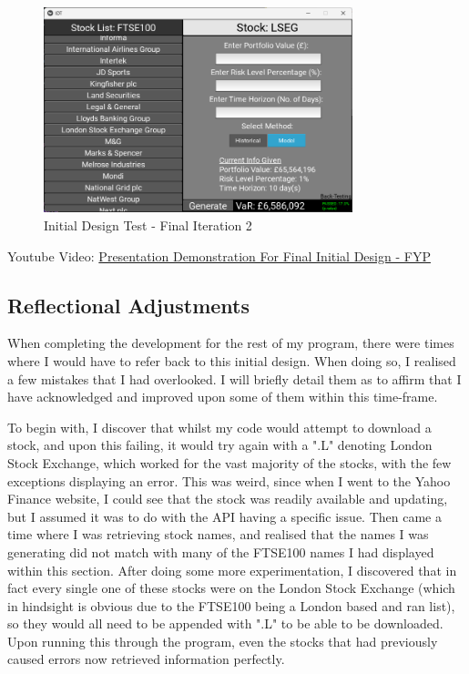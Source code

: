 \documentclass{article}
\begin{document}
\begin{figure}[h!]
  \centering
  \includegraphics[width=0.8\textwidth]{Images/Initial Design Tes - Final Iteration 2.png}
  \caption{Initial Design Test - Final Iteration 2}
  \label{fig:Initial Design Test - Final Iteration 2}
\end{figure}

Youtube Video: \href{https://youtu.be/2GIWug_IESI}{Presentation Demonstration For Final Initial Design - FYP}

\subsection{Reflectional Adjustments}
When completing the development for the rest of my program, there were times where I would have to refer back to this initial design. When doing so, I realised a few mistakes that I had overlooked. I will briefly detail them as to affirm that I have acknowledged and improved upon some of them within this time-frame.\\\vspace{0.3cm}

To begin with, I discover that whilst my code would attempt to download a stock, and upon this failing, it would try again with a ".L" denoting London Stock Exchange, which worked for the vast majority of the stocks, with the few exceptions displaying an error. This was weird, since when I went to the Yahoo Finance website, I could see that the stock was readily available and updating, but I assumed it was to do with the API having a specific issue. Then came a time where I was retrieving stock names, and realised that the names I was generating did not match with many of the FTSE100 names I had displayed within this section. After doing some more experimentation, I discovered that in fact every single one of these stocks were on the London Stock Exchange (which in hindsight is obvious due to the FTSE100 being a London based and ran list), so they would all need to be appended with ".L" to be able to be downloaded. Upon running this through the program, even the stocks that had previously caused errors now retrieved information perfectly.\\\vspace{0.3cm}
\end{document}

